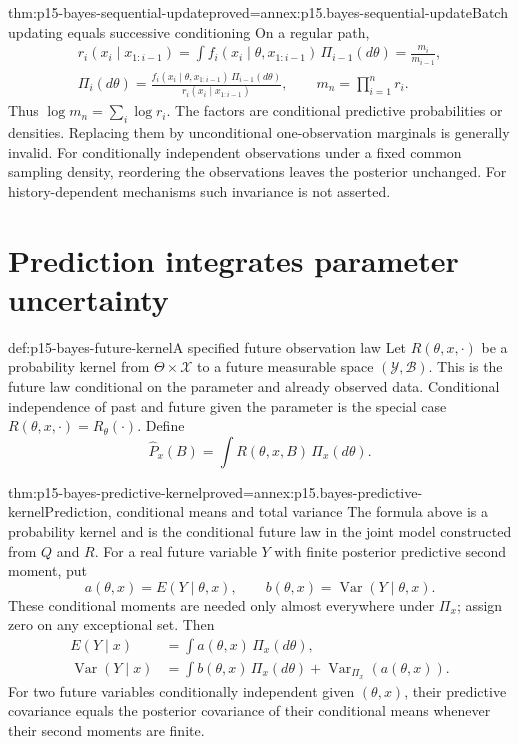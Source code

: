 \begin{hbtheorem}{thm:p15-bayes-sequential-update}{proved=annex:p15.bayes-sequential-update}{Batch updating equals successive conditioning}
On a regular path,
\[
 \begin{gathered}
 r_i(x_i\mid x_{1:i-1})
     =\int f_i(x_i\mid\theta,x_{1:i-1})\,\Pi_{i-1}(d\theta)
     =\frac{m_i}{m_{i-1}},\\
 \Pi_i(d\theta)=
 \frac{f_i(x_i\mid\theta,x_{1:i-1})\,\Pi_{i-1}(d\theta)}
      {r_i(x_i\mid x_{1:i-1})},\qquad
 m_n=\prod_{i=1}^n r_i .
 \end{gathered}
\]
Thus \(\log m_n=\sum_i\log r_i\). The factors are conditional
predictive probabilities or densities. Replacing them by unconditional
one-observation marginals is generally invalid.
For conditionally independent observations under a fixed common
sampling density, reordering the observations leaves the posterior
unchanged. For history-dependent mechanisms such invariance is not asserted.
\end{hbtheorem}

\section{Prediction integrates parameter uncertainty}
\label{sec:p15-bayes-prediction}

\begin{hbdefinition}{def:p15-bayes-future-kernel}{A specified future observation law}
Let \(R(\theta,x,\cdot)\) be a probability kernel from
\(\Theta\times\mathcal X\) to a future measurable space
\((\mathcal Y,\mathcal B)\). This is the future law conditional
on the parameter and already observed data. Conditional independence
of past and future given the parameter is the special case
\(R(\theta,x,\cdot)=R_\theta(\cdot)\).
Define
\[
                       \widehat P_x(B)
                         =\int R(\theta,x,B)\,\Pi_x(d\theta).
\]
\end{hbdefinition}

\begin{hbtheorem}{thm:p15-bayes-predictive-kernel}{proved=annex:p15.bayes-predictive-kernel}{Prediction, conditional means and total variance}
The formula above is a probability kernel and is the conditional
future law in the joint model constructed from \(Q\) and \(R\).
For a real future variable \(Y\) with finite posterior predictive
second moment, put
\[
 a(\theta,x)=E(Y\mid\theta,x),\qquad
 b(\theta,x)=\operatorname{Var}(Y\mid\theta,x).
\]
These conditional moments are needed only almost everywhere under
\(\Pi_x\); assign zero on any exceptional set.
Then
\[
 \begin{split}
 E(Y\mid x)&=\int a(\theta,x)\,\Pi_x(d\theta),\\
 \operatorname{Var}(Y\mid x)
  &=\int b(\theta,x)\,\Pi_x(d\theta)
       +\operatorname{Var}_{\Pi_x}(a(\theta,x)).
 \end{split}
\]
For two future variables conditionally independent given \((\theta,x)\),
their predictive covariance equals the posterior covariance of their
conditional means whenever their second moments are finite.
\end{hbtheorem}


